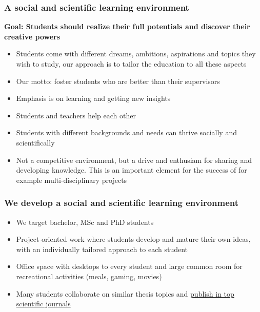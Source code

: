 \documentclass{beamer}
\begin{document}
\begin{frame}
\frametitle{A social and scientific learning environment}

\begin{block}{}
\textbf{Goal: Students should realize their full potentials and discover their creative powers}

\begin{itemize}
 \item Students come with different dreams, ambitions, aspirations and topics they wish to study, our approach is to tailor the education to all these aspects

 \item Our motto: foster students who are better than their supervisors

 \item Emphasis is on learning and getting new insights

 \item Students and teachers help each other

 \item Students with different backgrounds and needs can thrive socially and scientifically

 \item Not a competitive environment, but a drive and enthusiam for sharing and developing knowledge. This is an important element for the  success of for example multi-disciplinary projects 
\end{itemize}

\noindent
\end{block}
\end{frame}

\begin{frame}
\frametitle{We develop a social and scientific learning environment}

\begin{block}{}
\begin{itemize}
\item We target bachelor, MSc and PhD students

\item Project-oriented work where students develop and mature their own ideas, with an individually tailored approach to each student

\item Office space with desktops to every student and large common room for recreational activities (meals, gaming, movies)

\item Many students collaborate on similar  thesis topics and \href{{http://www.dn.no/talent/2014/06/12/Utdannelse/sommervikar-ble-toppforsker}}{publish in top scientific journals}
\end{itemize}

\noindent
\end{block}
\end{frame}
\end{document}
